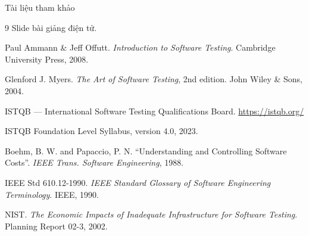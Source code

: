\documentclass[aspectratio=169,12pt]{beamer}
\begin{document}
\begin{frame}{Tài liệu tham khảo}
  \vspace*{-0.4em}
  \footnotesize
  \begin{thebibliography}{9}
    Slide bài giảng điện tử.

    Paul Ammann \& Jeff Offutt. \textit{Introduction to Software Testing}.
    Cambridge University Press, 2008.

    Glenford J. Myers. \textit{The Art of Software Testing}, 2nd edition.
    John Wiley \& Sons, 2004.

    ISTQB --- International Software Testing Qualifications Board.
    \url{https://istqb.org/}

    ISTQB Foundation Level Syllabus, version 4.0, 2023.

    Boehm, B. W. and Papaccio, P. N. ``Understanding and Controlling
    Software Costs''. \textit{IEEE Trans. Software Engineering}, 1988.

    IEEE Std 610.12-1990. \textit{IEEE Standard Glossary of Software
    Engineering Terminology}. IEEE, 1990.

    NIST. \textit{The Economic Impacts of Inadequate Infrastructure for
    Software Testing}. Planning Report 02-3, 2002.
  \end{thebibliography}
\end{frame}

\end{document}
